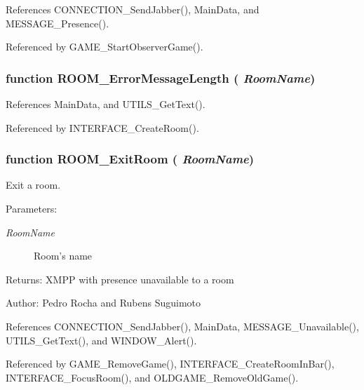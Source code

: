 References CONNECTION\_\-SendJabber(), MainData, and MESSAGE\_\-Presence().

Referenced by GAME\_\-StartObserverGame().
\subsubsection[ROOM\_\-ErrorMessageLength]{\setlength{\rightskip}{0pt plus 5cm}function ROOM\_\-ErrorMessageLength ( {\em RoomName})}\label{room_2room_8js_4d9f1bf611aa33205ace8c5e34323964}




References MainData, and UTILS\_\-GetText().

Referenced by INTERFACE\_\-CreateRoom().
\subsubsection[ROOM\_\-ExitRoom]{\setlength{\rightskip}{0pt plus 5cm}function ROOM\_\-ExitRoom ( {\em RoomName})}\label{room_2room_8js_d64107f06cd835aba1e8cfe7eb256b21}


Exit a room. 

\begin{Desc}
\item[Parameters:]
\begin{description}
\item[{\em RoomName}]Room's name \end{description}
\end{Desc}
\begin{Desc}
\item[Returns:]XMPP with presence unavailable to a room \end{Desc}
\begin{Desc}
\item[Author:]Pedro Rocha and Rubens Suguimoto \end{Desc}


References CONNECTION\_\-SendJabber(), MainData, MESSAGE\_\-Unavailable(), UTILS\_\-GetText(), and WINDOW\_\-Alert().

Referenced by GAME\_\-RemoveGame(), INTERFACE\_\-CreateRoomInBar(), INTERFACE\_\-FocusRoom(), and OLDGAME\_\-RemoveOldGame().
